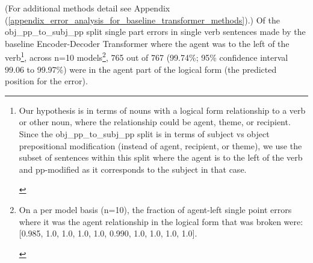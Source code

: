 \documentclass[11pt]{article}
\begin{document}

(For additional methods detail see Appendix (\ref{appendix_error_analysis_for_baseline_transformer_methods}).) Of the obj\_pp\_to\_subj\_pp split single part errors in single verb sentences made by the \citep{Wu2023} baseline Encoder-Decoder Transformer where the agent was to the left of the verb\footnote{\begin{footnotesize}Our hypothesis is in terms of nouns with a logical form relationship to a verb or other noun, where the relationship could be agent, theme, or recipient.
Since the obj\_pp\_to\_subj\_pp split is in terms of subject vs object prepositional modification (instead of agent, recipient, or theme), we use the subset of sentences within this split where the agent is to the left of the verb and pp-modified as it corresponds to the subject in that case.
\end{footnotesize}
}, 
across n=10 models\footnote{\begin{footnotesize}On a per model basis (n=10), the fraction of agent-left single point errors where it was the agent relationship in the logical form that was broken were: [0.985, 1.0, 1.0, 1.0, 1.0, 0.990, 1.0, 1.0, 1.0, 1.0].
\end{footnotesize}
}, 765 out of 767 (99.74\%; 95\% confidence interval 99.06 to 99.97\%) were in the agent part of the logical form (the predicted position for the error).
\end{document}
